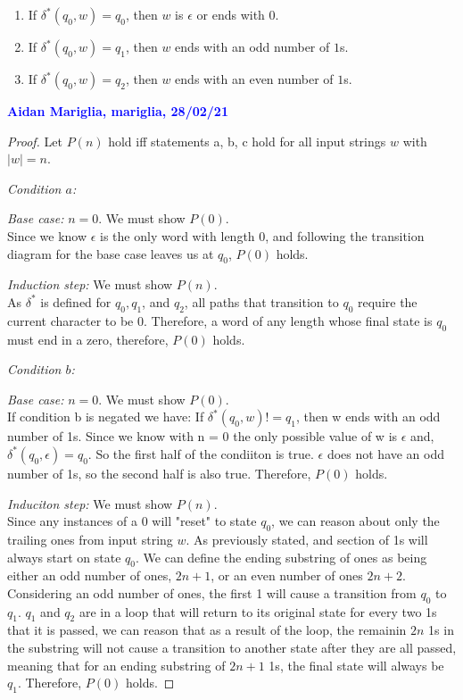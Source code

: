 \documentclass[11pt,fleqn]{article}
\newcommand{\be}{\begin{enumerate}}
\newcommand{\ee}{\end{enumerate}}
\newcommand{\eps}{\epsilon}
\begin{document}
   \be

     \item If $\delta^*(q_0,w) = q_0$, then $w$ is $\epsilon$ or ends
       with $0$.

     \item If $\delta^*(q_0,w) = q_1$, then $w$ ends with an odd
       number of $1$s.

     \item If $\delta^*(q_0,w) = q_2$, then $w$ ends
       with an even number of $1$s.

   \ee
	
   \textcolor{blue}{\textbf{Aidan Mariglia, mariglia, 28/02/21}}\\
   

   \begin{proof}
    Let $P(n)$ hold iff statements a, b, c hold for all input strings $w$
    with $|w| = n$.

    \emph{Condition $a$:}
    

    \emph{Base case:} $n = 0$. We must show $P(0)$.\\
    Since we know $\eps$ is the only word with length 0, and following the
    transition diagram for the base case leaves us at $q_0$, $P(0)$ holds.

    \emph{Induction step:} We must show $P(n)$.\\
    As $\delta^*$ is defined for $q_0, q_1$, and $q_2$, all paths
    that transition to $q_0$ require the current character to be $0$.
    Therefore, a word of any length whose final state is $q_0$ must end in a zero,
    therefore, $P(0)$ holds.

    \emph{Condition $b$:}


    \emph{Base case:} $n = 0$. We must show $P(0)$.\\
    If condition b is negated we have:
    If $\delta^*(q_0, w) != q_1$, then w ends with an odd number of
    1s. Since we know with n = 0 the only possible value of w is $\eps$ and,
    $\delta^*(q_0, \eps) = q_0$. So the first half of the condiiton is true.
    $\eps$ does not have an odd number of 1s, so the second half is also true.
    Therefore, $P(0)$ holds.

    \emph{Induciton step:} We must show $P(n)$.\\
    Since any instances of a 0 will "reset" to state $q_0$,
    we can reason about only the trailing ones from input string $w$.
    As previously stated, and section of 1s will always start on state
    $q_0$. We can define the ending substring of ones as being either an
    odd number of ones, $2n+1$, or an even number of ones $2n + 2$. Considering
    an odd number of ones, the first 1 will cause a transition from $q_0$ to $q_1$.
    $q_1$ and $q_2$ are in a loop that will return to its original state for every
    two 1s that it is passed, we can reason that as a result of the loop,
    the remainin $2n$ 1s in the substring will not cause a transition to another
    state after they are all passed, meaning
    that for an ending substring of $2n+1$ 1s, the final state will always be $q_1$.
    Therefore, $P(0)$ holds.


\end{proof}
\end{document}
